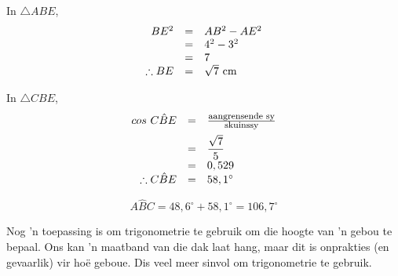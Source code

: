 \begin{wex}
{
In $\triangle ABE$, \\
\begin{equation*}
\begin{array}{ccl}
 \hfill BE^{2} &=& AB^{2} - AE^{2} \hfill \\
\hfill &=& 4^{2} - 3^{2} \hfill \\
\hfill &=&7\\
\therefore BE &=& \sqrt{7} \mbox{ cm}
\end{array}
\end{equation*}

% 

In $\triangle CBE$, 
\begin{equation*}
\begin{array}{rcl}\hfill cos~C\hat{B}E &=& \frac{\mbox{\footnotesize aangrensende sy}}{\mbox{\footnotesize skuinssy}}\hfill \vspace{5pt}\\
 \hfill &=& \dfrac{\sqrt{7}}{5}\hfill \\
\hfill &=& 0,529 \hfill \\
 \therefore C\hat{B}E &= & {58,1}^{\circ }
\end{array}
\end{equation*}

\begin{equation*}
A\hat{B}C = 48,6^{\circ} + 58,1^{\circ} = 106,7^{\circ}
\end{equation*}
}
\end{wex}



Nog 'n toepassing is om trigonometrie te gebruik om die hoogte van 'n gebou te bepaal. Ons kan 'n maatband van die dak laat hang, maar dit is onprakties (en gevaarlik) vir ho\"e geboue. Dis veel meer sinvol om trigonometrie te gebruik.\clearpage

